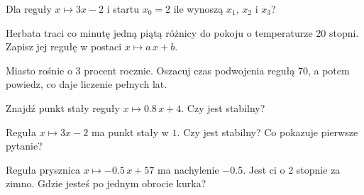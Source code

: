 \begin{checkpoint}
\item Dla reguły $x \mapsto 3x - 2$ i startu $x_0 = 2$ ile wynoszą $x_1$,
  $x_2$ i $x_3$?
\item Herbata traci co minutę jedną piątą różnicy do pokoju o temperaturze
  20 stopni. Zapisz jej regułę w postaci $x \mapsto a\,x + b$.
\item Miasto rośnie o 3 procent rocznie. Oszacuj czas podwojenia regułą
  70, a potem powiedz, co daje liczenie pełnych lat.
\item Znajdź punkt stały reguły $x \mapsto \num{0.8}\,x + 4$. Czy jest
  stabilny?
\item Reguła $x \mapsto 3x - 2$ ma punkt stały w $1$. Czy jest stabilny? Co
  pokazuje pierwsze pytanie?
\item Reguła prysznica $x \mapsto \num{-0.5}\,x + 57$ ma nachylenie
  \num{-0.5}. Jest ci o 2 stopnie za zimno. Gdzie jesteś po jednym obrocie
  kurka?
\end{checkpoint}
